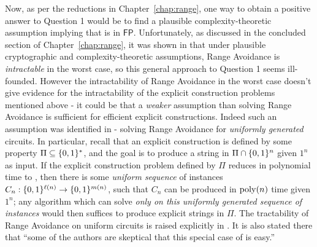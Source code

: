 Now, as per the reductions in Chapter~\ref{chap:range}, one way to obtain a positive answer to Question 1 would be to find a plausible complexity-theoretic assumption implying that \avoid is in $\mathsf{FP}$. Unfortunately, as discussed in the concluded section of Chapter~\ref{chap:range}, it was shown in \cite{ILW23} that under plausible cryptographic and complexity-theoretic assumptions, Range Avoidance is {\it intractable} in the worst case, so this general approach to Question 1 seems ill-founded. 
However the intractability of Range Avoidance in the worst case doesn't give evidence for the intractability of the explicit construction problems mentioned above - it could be that a {\it weaker} assumption than solving Range Avoidance is sufficient for efficient explicit constructions. Indeed such an assumption was identified in \cite{ILW23} - solving Range Avoidance for {\it uniformly generated} circuits. In particular, recall that an explicit construction is defined by some property $\Pi \subseteq \{0,1\}^*$, and the goal is to produce a string in $\Pi \cap \{0,1\}^n$ given $1^n$ as input. If the explicit construction problem defined by $\Pi$ reduces in polynomial time to \avoid, then there is some \emph{uniform sequence} of \avoid instances $C_n: \{0,1\}^{\ell(n)} \to \{0,1\}^{m(n)}$, such that $C_n$ can be produced in $\mathrm{poly}(n)$ time given $1^n$; any algorithm which can solve \avoid \emph{only on this uniformly generated sequence of instances} would then suffices to produce explicit strings in $\Pi$. The tractability of Range Avoidance on uniform circuits is raised explicitly in \cite{ILW23}. It is also stated there that ``some of the authors are skeptical that this special case of \avoid is easy.''



